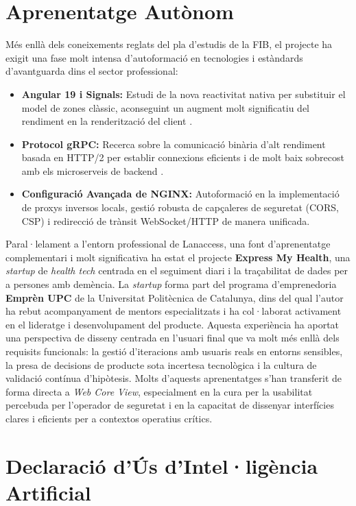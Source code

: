 \section{Aprenentatge Autònom}
Més enllà dels coneixements reglats del pla d'estudis de la FIB, el projecte ha exigit una fase molt intensa d'autoformació en tecnologies i estàndards d'avantguarda dins el sector professional:
\begin{itemize}
  \item \textbf{Angular 19 i Signals:} Estudi de la nova reactivitat nativa per substituir el model de zones clàssic, aconseguint un augment molt significatiu del rendiment en la renderització del client \cite{angular_signals}.
  \item \textbf{Protocol gRPC:} Recerca sobre la comunicació binària d'alt rendiment basada en HTTP/2 per establir connexions eficients i de molt baix sobrecost amb els microserveis de backend \cite{grpc_io}.
  \item \textbf{Configuració Avançada de NGINX:} Autoformació en la implementació de proxys inversos locals, gestió robusta de capçaleres de seguretat (CORS, CSP) i redirecció de trànsit WebSocket/HTTP de manera unificada.
\end{itemize}

Paral·lelament a l'entorn professional de Lanaccess, una font d'aprenentatge complementari i molt significativa ha estat el projecte \textbf{Express My Health}, una \textit{startup} de \textit{health tech} centrada en el seguiment diari i la traçabilitat de dades per a persones amb demència. La \textit{startup} forma part del programa d'emprenedoria \textbf{Emprèn UPC} de la Universitat Politècnica de Catalunya, dins del qual l'autor ha rebut acompanyament de mentors especialitzats i ha col·laborat activament en el lideratge i desenvolupament del producte. Aquesta experiència ha aportat una perspectiva de disseny centrada en l'usuari final que va molt més enllà dels requisits funcionals: la gestió d'iteracions amb usuaris reals en entorns sensibles, la presa de decisions de producte sota incertesa tecnològica i la cultura de validació contínua d'hipòtesis. Molts d'aquests aprenentatges s'han transferit de forma directa a \textit{Web Core View}, especialment en la cura per la usabilitat percebuda per l'operador de seguretat i en la capacitat de dissenyar interfícies clares i eficients per a contextos operatius crítics.

\section{Declaració d'Ús d'Intel·ligència Artificial}
\label{sec:declaracio_ia}


